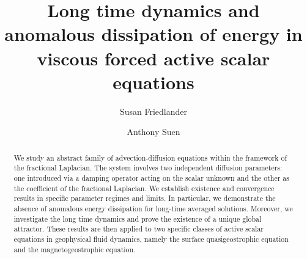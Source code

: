 \documentclass[reqno]{amsart}%
\theoremstyle{definition}
\theoremstyle{remark}
\numberwithin{equation}{section}
\newcommand{\1}{\mathbf{1}}
\numberwithin{equation}{section}
\numberwithin{theorem}{section}
\numberwithin{figure}{section}
\begin{document}
%
%
%
%
%
%
%
%
%


\title[viscous forced active scalar]
 {Long time dynamics and anomalous dissipation of energy in viscous forced active scalar equations}

\author{Susan Friedlander}

\address{Department of Mathematics\\
University of Southern California}


\author{Anthony Suen}

\address{Department of Mathematics and Information Technology\\
The Education University of Hong Kong}


\date{}



\begin{abstract}
We study an abstract family of advection-diffusion equations within the framework of the fractional Laplacian. The system involves two independent diffusion parameters: one introduced via a damping operator acting on the scalar unknown and the other as the coefficient of the fractional Laplacian. We establish existence and convergence results in specific parameter regimes and limits. In particular, we demonstrate the absence of anomalous energy dissipation for long-time averaged solutions. Moreover, we investigate the long time dynamics and prove the existence of a unique global attractor. These results are then applied to two specific classes of active scalar equations in geophysical fluid dynamics, namely the surface quasigeostrophic equation and the magnetogeostrophic equation.
\end{abstract}
\end{document}
